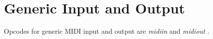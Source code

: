 \begin{comment}
\documentclass[10pt]{article}
\usepackage{fullpage, graphicx, url}
\setlength{\parskip}{1ex}
\setlength{\parindent}{0ex}
\title{Generic Input and Output}



\begin{tabular}{ccc}
The Alternative Csound Reference Manual & & \\
Previous &MIDI Support &Next

\end{tabular}

\end{comment}
\section{Generic Input and Output}


  Opcodes for generic MIDI input and output are \emph{midiin}
 and \emph{midiout}
. 


\begin{comment}
\begin{tabular}{lcr}
Previous &Home &Next \\
Event Extenders &Up &Note-on/Note-off

\end{tabular}



\end{comment}
